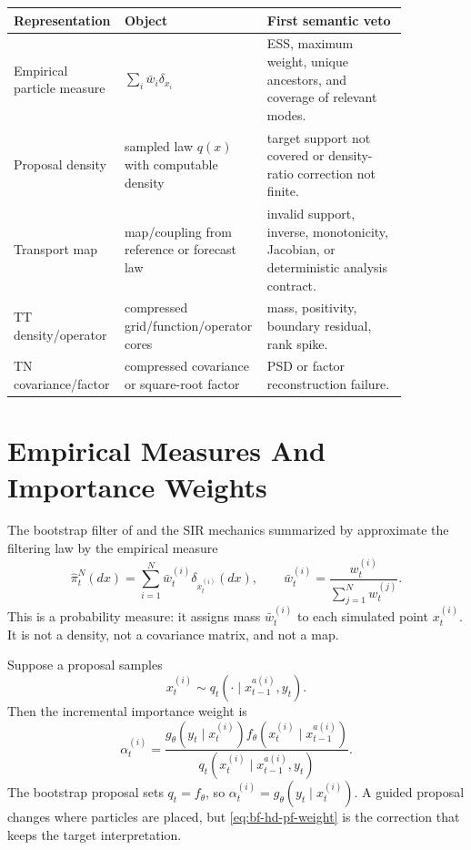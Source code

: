\begin{longtable}{@{}p{0.18\linewidth}p{0.33\linewidth}p{0.35\linewidth}@{}}
\toprule
Representation & Object & First semantic veto \\
\midrule
\endhead
Empirical particle measure & \(\sum_i\bar w_i\delta_{x_i}\) & ESS, maximum
weight, unique ancestors, and coverage of relevant modes. \\
Proposal density & sampled law \(q(x)\) with computable density & target
support not covered or density-ratio correction not finite. \\
Transport map & map/coupling from reference or forecast law & invalid support,
inverse, monotonicity, Jacobian, or deterministic analysis contract. \\
TT density/operator & compressed grid/function/operator cores & mass,
positivity, boundary residual, rank spike. \\
TN covariance/factor & compressed covariance or square-root factor & PSD or
factor reconstruction failure. \\
\bottomrule
\end{longtable}

\section{Empirical Measures And Importance Weights}
\label{sec:bf-hd-pf}

The bootstrap filter of \citet{gordon1993novel} and the SIR mechanics
summarized by \citet{arulampalam2002tutorial} approximate the filtering law by
the empirical measure
\begin{equation}
  \widehat\pi_t^N(dx)=\sum_{i=1}^N \bar w_t^{(i)}\delta_{x_t^{(i)}}(dx),
  \qquad
  \bar w_t^{(i)}=\frac{w_t^{(i)}}{\sum_{j=1}^N w_t^{(j)}}.
  \label{eq:bf-hd-pf-measure}
\end{equation}
This is a probability measure: it assigns mass \(\bar w_t^{(i)}\) to each
simulated point \(x_t^{(i)}\).  It is not a density, not a covariance matrix,
and not a map.

Suppose a proposal samples
\[
  x_t^{(i)}\sim q_t(\cdot\mid x_{t-1}^{a(i)},y_t).
\]
Then the incremental importance weight is
\begin{equation}
  \alpha_t^{(i)}
  =
  \frac{
  g_\theta(y_t\mid x_t^{(i)})
  f_\theta(x_t^{(i)}\mid x_{t-1}^{a(i)})
  }{
  q_t(x_t^{(i)}\mid x_{t-1}^{a(i)},y_t)
  }.
  \label{eq:bf-hd-pf-weight}
\end{equation}
The bootstrap proposal sets \(q_t=f_\theta\), so
\(\alpha_t^{(i)}=g_\theta(y_t\mid x_t^{(i)})\).  A guided proposal changes
where particles are placed, but \eqref{eq:bf-hd-pf-weight} is the correction
that keeps the target interpretation.

